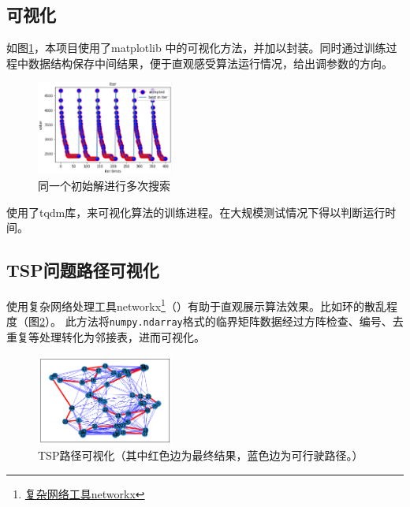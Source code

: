 \documentclass[lang=cn,11pt]{elegantpaper}
\begin{document}
\subsection{可视化}
如图\ref{img:同随机数种子}，本项目使用了matplotlib 中的可视化方法，并加以封装。同时通过训练过程中数据结构保存中间结果，便于直观感受算法运行情况，给出调参数的方向。
\begin{figure}[h!]
  \centering
  \includegraphics[width=0.4\textwidth]{figure/同随机数种子、同初始解多次运行结果.png} %
  \caption{同一个初始解进行多次搜索} %
  \label{img:同随机数种子} %
\end{figure}

使用了tqdm库，来可视化算法的训练进程。在大规模测试情况下得以判断运行时间。

\subsection{TSP问题路径可视化}
使用复杂网络处理工具networkx\footnote{\href{https://networkx.org/documentation/stable/auto_examples/index.html}{复杂网络工具networkx}}（\cite{NetworkXpaper}）有助于直观展示算法效果。比如环的散乱程度（图\ref{img:TSP路径可视化}）。
此方法将\lstinline{numpy.ndarray}格式的临界矩阵数据经过方阵检查、编号、去重复等处理转化为邻接表，进而可视化。


\begin{figure}[h!]
  \centering
  \includegraphics[width=0.4\textwidth]{figure/TSP路径可视化.png} %
  \caption{TSP路径可视化（其中红色边为最终结果，蓝色边为可行驶路径。）} %
  \label{img:TSP路径可视化} %
\end{figure}
\end{document}
